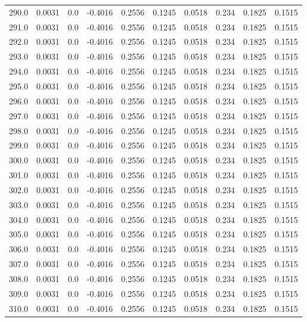 \begin{longtable}{lrrrrrrrrr}
290.0 & 0.0031 & 0.0 & -0.4016 & 0.2556 & 0.1245 & 0.0518 & 0.234 & 0.1825 & 0.1515 \\
291.0 & 0.0031 & 0.0 & -0.4016 & 0.2556 & 0.1245 & 0.0518 & 0.234 & 0.1825 & 0.1515 \\
292.0 & 0.0031 & 0.0 & -0.4016 & 0.2556 & 0.1245 & 0.0518 & 0.234 & 0.1825 & 0.1515 \\
293.0 & 0.0031 & 0.0 & -0.4016 & 0.2556 & 0.1245 & 0.0518 & 0.234 & 0.1825 & 0.1515 \\
294.0 & 0.0031 & 0.0 & -0.4016 & 0.2556 & 0.1245 & 0.0518 & 0.234 & 0.1825 & 0.1515 \\
295.0 & 0.0031 & 0.0 & -0.4016 & 0.2556 & 0.1245 & 0.0518 & 0.234 & 0.1825 & 0.1515 \\
296.0 & 0.0031 & 0.0 & -0.4016 & 0.2556 & 0.1245 & 0.0518 & 0.234 & 0.1825 & 0.1515 \\
297.0 & 0.0031 & 0.0 & -0.4016 & 0.2556 & 0.1245 & 0.0518 & 0.234 & 0.1825 & 0.1515 \\
298.0 & 0.0031 & 0.0 & -0.4016 & 0.2556 & 0.1245 & 0.0518 & 0.234 & 0.1825 & 0.1515 \\
299.0 & 0.0031 & 0.0 & -0.4016 & 0.2556 & 0.1245 & 0.0518 & 0.234 & 0.1825 & 0.1515 \\
300.0 & 0.0031 & 0.0 & -0.4016 & 0.2556 & 0.1245 & 0.0518 & 0.234 & 0.1825 & 0.1515 \\
301.0 & 0.0031 & 0.0 & -0.4016 & 0.2556 & 0.1245 & 0.0518 & 0.234 & 0.1825 & 0.1515 \\
302.0 & 0.0031 & 0.0 & -0.4016 & 0.2556 & 0.1245 & 0.0518 & 0.234 & 0.1825 & 0.1515 \\
303.0 & 0.0031 & 0.0 & -0.4016 & 0.2556 & 0.1245 & 0.0518 & 0.234 & 0.1825 & 0.1515 \\
304.0 & 0.0031 & 0.0 & -0.4016 & 0.2556 & 0.1245 & 0.0518 & 0.234 & 0.1825 & 0.1515 \\
305.0 & 0.0031 & 0.0 & -0.4016 & 0.2556 & 0.1245 & 0.0518 & 0.234 & 0.1825 & 0.1515 \\
306.0 & 0.0031 & 0.0 & -0.4016 & 0.2556 & 0.1245 & 0.0518 & 0.234 & 0.1825 & 0.1515 \\
307.0 & 0.0031 & 0.0 & -0.4016 & 0.2556 & 0.1245 & 0.0518 & 0.234 & 0.1825 & 0.1515 \\
308.0 & 0.0031 & 0.0 & -0.4016 & 0.2556 & 0.1245 & 0.0518 & 0.234 & 0.1825 & 0.1515 \\
309.0 & 0.0031 & 0.0 & -0.4016 & 0.2556 & 0.1245 & 0.0518 & 0.234 & 0.1825 & 0.1515 \\
310.0 & 0.0031 & 0.0 & -0.4016 & 0.2556 & 0.1245 & 0.0518 & 0.234 & 0.1825 & 0.1515 \\

\end{longtable}
